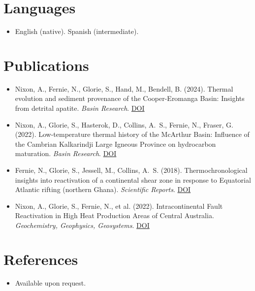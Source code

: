 \documentclass[11pt,a4paper,sans]{moderncv}
\begin{document}
\section{Languages}
\vspace{1pt}
\begin{itemize}
\item English (native). Spanish (intermediate).
\end{itemize}

\section{Publications}
\vspace{1pt}
\begin{itemize}
\item Nixon, A., Fernie, N., Glorie, S., Hand, M., Bendell, B. (2024). Thermal evolution and sediment provenance of the Cooper-Eromanga Basin: Insights from detrital apatite. \textit{Basin Research}. \href{https://doi.org/10.1111/bre.12843}{DOI}
\item Nixon, A., Glorie, S., Hasterok, D., Collins, A.~S., Fernie, N., Fraser, G. (2022). Low-temperature thermal history of the McArthur Basin: Influence of the Cambrian Kalkarindji Large Igneous Province on hydrocarbon maturation. \textit{Basin Research}. \href{https://doi.org/10.1111/bre.12691}{DOI}
\item Fernie, N., Glorie, S., Jessell, M., Collins, A.~S. (2018). Thermochronological insights into reactivation of a continental shear zone in response to Equatorial Atlantic rifting (northern Ghana). \textit{Scientific Reports}. \href{https://doi.org/10.1038/s41598-018-34769-x}{DOI}
\item Nixon, A., Glorie, S., Fernie, N., et al. (2022). Intracontinental Fault Reactivation in High Heat Production Areas of Central Australia. \textit{Geochemistry, Geophysics, Geosystems}. \href{https://doi.org/10.1029/2022gc010559}{DOI}
\end{itemize}

\section{References}
\vspace{1pt}
\begin{itemize}
\item{Available upon request.}
\end{itemize}
\end{document}
